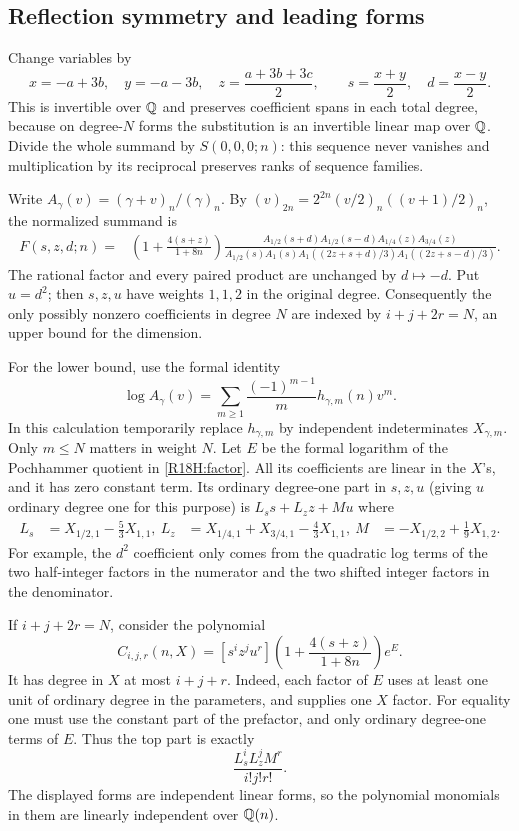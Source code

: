 \documentclass[11pt,a4paper]{article}
\begin{document}
\subsection{Reflection symmetry and leading forms}
Change variables by
\[
x=-a+3b,\quad y=-a-3b,\quad z=\frac{a+3b+3c}{2},
\qquad s=\frac{x+y}{2},\quad d=\frac{x-y}{2}.
\]
This is invertible over $\mathbb Q$ and preserves coefficient spans in each
total degree, because on degree-$N$ forms the substitution is an invertible
linear map over $\mathbb Q$. Divide the whole summand by $S(0,0,0;n)$: this
sequence never vanishes and multiplication by its reciprocal preserves
ranks of sequence families.

Write $A_\gamma(v)=(\gamma+v)_n/(\gamma)_n$. By
$(v)_{2n}=2^{2n}(v/2)_n((v+1)/2)_n$, the normalized summand is
\begin{align}
F(s,z,d;n)={}&\left(1+\frac{4(s+z)}{1+8n}\right)
 \frac{A_{1/2}(s+d) A_{1/2}(s-d) A_{1/4}(z) A_{3/4}(z)}
 {A_{1/2}(s) A_1(s)
  A_1((2z+s+d)/3) A_1((2z+s-d)/3)}.
\label{R18H:factor}
\end{align}
The rational factor and every paired product are unchanged by $d\mapsto-d$.
Put $u=d^2$; then $s,z,u$ have weights $1,1,2$ in the original degree.
Consequently the only possibly nonzero coefficients in degree $N$
are indexed by $i+j+2r=N$, an upper bound for the dimension.

For the lower bound, use the formal identity
\[
\log A_\gamma(v)=\sum_{m\geq1}
 \frac{(-1)^{m-1}}m h_{\gamma,m}(n) v^m.
\]
In this calculation temporarily replace $h_{\gamma,m}$ by independent
indeterminates $X_{\gamma,m}$. Only $m\leq N$ matters in weight $N$.
Let $E$ be the formal logarithm of the Pochhammer quotient in
\eqref{R18H:factor}. All its coefficients are linear in the $X$'s, and it has
zero constant term. Its ordinary degree-one part in $s,z,u$ (giving $u$
ordinary degree one for this purpose) is $L_s s+L_z z+M u$ where
\begin{align*}
L_s &= X_{1/2,1}-\tfrac53 X_{1,1},\
L_z &= X_{1/4,1}+X_{3/4,1}-\tfrac43 X_{1,1},\
M   &= -X_{1/2,2}+\tfrac19 X_{1,2}.
\end{align*}
For example, the $d^2$ coefficient only comes from the quadratic
log terms of the two half-integer factors in the numerator and the two
shifted integer factors in the denominator.

If $i+j+2r=N$, consider the polynomial
\[
C_{i,j,r}(n,X)=[s^i z^j u^r]\left(1+\frac{4(s+z)}{1+8n}\right)e^E.
\]
It has degree in $X$ at most $i+j+r$. Indeed, each factor of $E$ uses
at least one unit of ordinary degree in the parameters, and supplies
one $X$ factor. For equality one must use the constant part of the
prefactor, and only ordinary degree-one terms of $E$. Thus the top part is
exactly
\begin{equation}
\frac{L_s^i L_z^j M^r}{i!j!r!}.
\label{R18H:leading}
\end{equation}
The displayed forms are independent linear forms, so the polynomial
monomials in them are linearly independent over $\mathbb Q(n)$.
\end{document}
